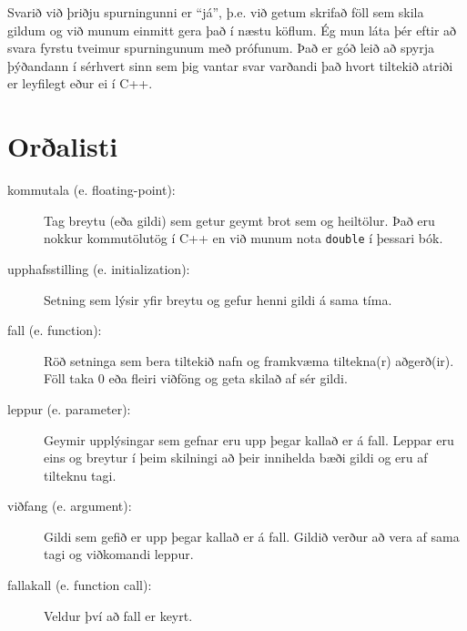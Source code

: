 Svarið við þriðju spurningunni er ``já'', þ.e. við getum skrifað föll sem skila gildum og við munum einmitt gera það í næstu köflum.
Ég mun láta þér eftir að svara fyrstu tveimur spurningunum með prófunum.
Það er góð leið að spyrja þýðandann í sérhvert sinn sem þig vantar svar varðandi það hvort tiltekið atriði er leyfilegt eður ei í C++.

\section{Orðalisti}

\begin{description}

\item[kommutala (e. floating-point):] Tag breytu (eða gildi) sem getur geymt brot sem og heiltölur.
Það eru nokkur kommutölutög í C++ en við munum nota {\tt double} í þessari bók.

\item[upphafsstilling (e. initialization):]  Setning sem lýsir yfir breytu og gefur henni gildi á sama tíma.

\item[fall (e. function):]  Röð setninga sem bera tiltekið nafn og framkvæma tiltekna(r) aðgerð(ir).
Föll taka 0 eða fleiri viðföng og geta skilað af sér gildi.

\item[leppur (e. parameter):]  Geymir upplýsingar sem gefnar eru upp þegar kallað er á fall.
Leppar eru eins og breytur í þeim skilningi að þeir innihelda bæði gildi og eru af tilteknu tagi.

\item[viðfang (e. argument):]  Gildi sem gefið er upp þegar kallað er á fall.
Gildið verður að vera af sama tagi og viðkomandi leppur.

\item[fallakall (e. function call):]  Veldur því að fall er keyrt. 


\end{description}